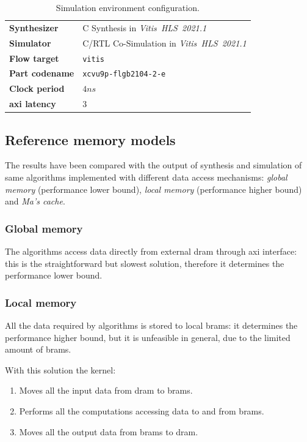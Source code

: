 \documentclass[11pt,a4paper,oneside]{memoir}
\begin{document}
\begin{table}[!htb]
	\begin{center}
		\begin{tabular}{ll}
			\hline
			\rowcolor{gray!25}
			\textbf{Synthesizer} & C Synthesis in
			\emph{Vitis\texttrademark~HLS~2021.1} \\
			\textbf{Simulator} & C/RTL Co-Simulation in
			\emph{Vitis\texttrademark~HLS~2021.1} \\
			\rowcolor{gray!25}
			\textbf{Flow target} & \texttt{vitis} \\
			\textbf{Part codename} & \texttt{xcvu9p-flgb2104-2-e} \\
			\rowcolor{gray!25}
			\textbf{Clock period} & $4 ns$ \\
			\textbf{\ac{axi} latency} & 3 \\
			\hline
		\end{tabular}
	\end{center}
	\caption{Simulation environment configuration.}
	\label{tab:sim_config}
\end{table}

\subsection{Reference memory models}
The results have been compared with the output of synthesis and simulation of
same algorithms implemented with different data access mechanisms: \emph{global
memory} (performance lower bound), \emph{local memory} (performance higher
bound) and \emph{Ma's cache}.

\subsubsection{Global memory}
The algorithms access data directly from external \ac{dram} through \ac{axi}
interface: this is the straightforward but slowest solution, therefore it
determines the performance lower bound.

\subsubsection{Local memory}
All the data required by algorithms is stored to local \acp{bram}: it determines
the performance higher bound, but it is unfeasible in general, due to the
limited amount of \acp{bram}.

With this solution the kernel:
\begin{enumerate}
	\item Moves all the input data from \ac{dram} to \acp{bram}.
	\item Performs all the computations accessing data to and from
		\acp{bram}. 
	\item Moves all the output data from \acp{bram} to \ac{dram}.
\end{enumerate}
\end{document}
